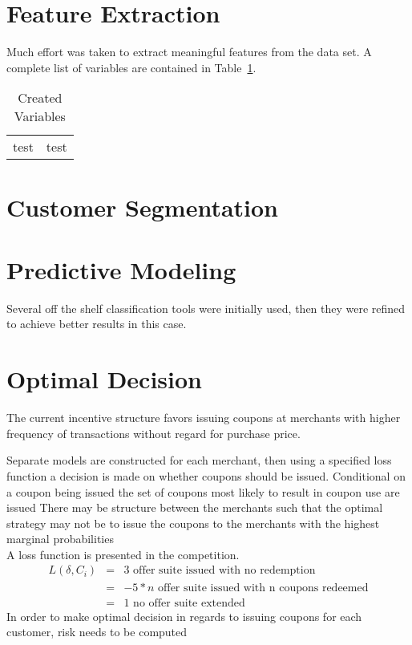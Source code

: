 \documentclass[12pt]{article} %
\begin{document}
\section{Feature Extraction}
Much effort was taken to extract meaningful features from the data set.  A complete list of variables are contained in Table~\ref{tab:vars}.

\begin{table}[h!]
\caption{Created Variables}
\begin{center}
\begin{tabular}{|c|c|}
test & test
\end{tabular}
\end{center}
\label{tab:vars}
\end{table}%

\section{Customer Segmentation}

\section{Predictive Modeling}
Several off the shelf classification tools were initially used, then they were refined to achieve better results in this case.
\section{Optimal Decision}
The current incentive structure favors issuing coupons at merchants with higher frequency of transactions without regard for purchase price.  

Separate models are constructed for each merchant, then using a specified loss function a decision is made on whether coupons should be issued.  Conditional on a coupon being issued the set of coupons most likely to result in coupon use are issued \ac{There may be structure between the merchants such that the optimal strategy may not be to issue the coupons to the merchants with the highest marginal probabilities} \\

A loss function is presented in the competition.  
\begin{eqnarray*}
L(\delta,C_i) &=& 3 \text {  offer suite issued with no redemption}\\
&=& -5 * n \text{  offer suite issued with n coupons redeemed}\\
&=& 1 \text{  no offer suite extended}
\end{eqnarray*}
In order to make optimal decision in regards to issuing coupons for each customer, risk needs to be computed
\end{document}
